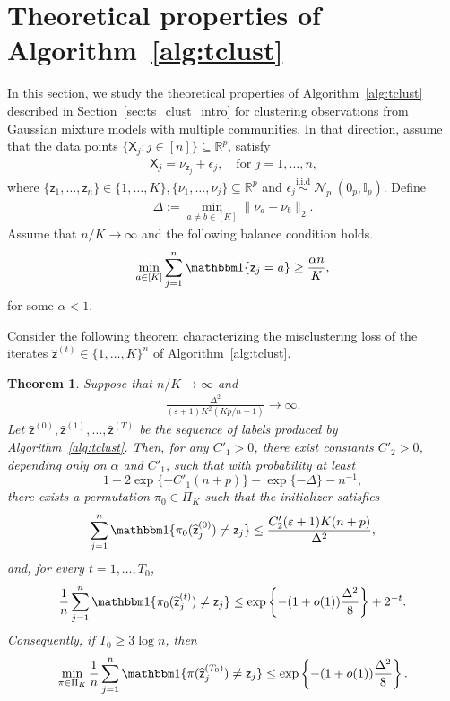 \documentclass[10pt]{article}
\newtheorem{theorem}{Theorem}
\newcommand{\R}{\mathbb R}
\newcommand{\simiid}{\overset{\mathrm{i.i.d}}{\sim}}
\newcommand{\Id}{\mathbb I}
\DeclareMathOperator{\dnorm}{\mathcal N}
\begin{document}
\section{Theoretical properties of Algorithm~\ref{alg:tclust}}
\label{sec:theo_t_clust}
In this section, we study the theoretical properties of Algorithm~\ref{alg:tclust} described in Section~\ref{sec:ts_clust_intro} for clustering observations from Gaussian mixture models with multiple communities. In that direction, assume that the data points \(\{\mathsf{X}_j:j\in[n]\}\subseteq\R^p\), satisfy
\begin{align}
    \mathsf{X}_j = \nu_{\mathsf{z}_j} + \epsilon_j, \quad \mbox{for $j=1,\ldots,n$,}
\end{align}
where $\{\mathsf{z}_1,\ldots,\mathsf{z}_n\} \in \{1,\ldots,K\}, \{\nu_1,\ldots,\nu_j\} \subseteq \R^p$ and $\epsilon_j \simiid \dnorm_p(0_p,\Id_p)$. Define
\begin{align}
\label{eq:global_delta}
\Delta:= \min_{a \neq b \in [K]} \|\nu_a-\nu_b\|_2.
\end{align}
Assume that $n/K \to \infty$ and the following balance condition holds.
\[
\min_{a \in [K]} \sum_{j=1}^n \mathbbm 1\{\mathsf{z}_j=a\} \ge \frac{\alpha n}{K},
\]
for some $\alpha<1$. 

Consider the following theorem characterizing the misclustering loss of the iterates $\widehat{\mathsf{z}}^{(t)} \in \{1,\ldots,K\}^n$ of Algorithm~\ref{alg:tclust}.

\begin{theorem}
\label{thm:tclust_iterates}
Suppose that $n/K\to\infty$ and
\begin{align}
\label{eq:k_means_condition}
    \frac{\Delta^2}{(\varepsilon+1)K^2(Kp/n+1)}\to\infty .
\end{align}
Let $\widehat{\mathsf z}^{(0)},\widehat{\mathsf z}^{(1)},\ldots,
\widehat{\mathsf z}^{(T)}$ be the sequence of labels produced by
Algorithm~\ref{alg:tclust}.
Then, for any $C'_1>0$, there exist constants $C'_2>0$, depending only on
$\alpha$ and $C'_1$, such that with probability at least
\[
    1-2\exp\{-C'_1(n+p)\}-\exp\{-\Delta\}-n^{-1},
\]
there exists a permutation $\pi_0\in\Pi_K$ such that the initializer satisfies
\[
    \sum_{j=1}^n\mathbbm 1\{\pi_0(\widehat{\mathsf z}_j^{(0)})\neq \mathsf z_j\}\le
    \frac{C'_2(\varepsilon+1)K(n+p)}
    {\Delta^2},
\]
and, for every $t=1,\ldots,T_0$,
\[
    \frac{1}{n}\sum_{j=1}^n\mathbbm 1\{\pi_0(\widehat{\mathsf z}_j^{(t)})\neq \mathsf z_j\}\le\exp\left\{-(1+o(1))\frac{\Delta^2}{8}\right\}
    +2^{-t}.
\]
Consequently, if $T_0\ge 3\log n$, then
\begin{align}
\label{eq:init_false}
    \min_{\pi\in\Pi_K}\frac{1}{n}\sum_{j=1}^n
    \mathbbm 1\{\pi(\widehat{\mathsf z}_j^{(T_0)})\neq \mathsf z_j\}\le\exp\left\{-(1+o(1))\frac{\Delta^2}{8}\right\}.
\end{align}
\end{theorem}
\end{document}
